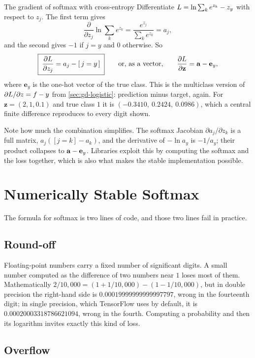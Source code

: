 \begin{derivation}{The gradient of softmax with cross-entropy}
Differentiate $L = \ln\sum_k e^{z_k} - z_y$ with respect to $z_j$. The first
term gives
\[
  \frac{\partial}{\partial z_j}\ln\sum_k e^{z_k}
  = \frac{e^{z_j}}{\sum_k e^{z_k}} = a_j ,
\]
and the second gives $-1$ if $j = y$ and $0$ otherwise. So
\[
  \boxed{\;\frac{\partial L}{\partial z_j} = a_j - [\,j = y\,]\;}
  \qquad\text{or, as a vector,}\qquad
  \frac{\partial L}{\partial\mathbf{z}} = \mathbf{a} - \mathbf{e}_y ,
\]
where $\mathbf{e}_y$ is the one-hot vector of the true class. This is the
multiclass version of $\partial L/\partial z = f - y$ from
\cref{sec:gd-logistic}: prediction minus target, again. For $\mathbf{z} = (2,
1, 0.1)$ and true class $1$ it is $(-0.3410,\ 0.2424,\ 0.0986)$, which a central
finite difference reproduces to every digit shown.

Note how much the combination simplifies. The softmax Jacobian
$\partial a_j/\partial z_k$ is a full matrix, $a_j([j=k] - a_k)$, and the
derivative of $-\ln a_y$ is $-1/a_y$; their product collapses to
$\mathbf{a} - \mathbf{e}_y$. Libraries exploit this by computing the softmax and the loss
together, which is also what makes the stable implementation possible.
\end{derivation}

\section{Numerically Stable Softmax}
\label{sec:stable-softmax}

The formula for softmax is two lines of code, and those two lines fail in
practice.

\subsection{Round-off}

Floating-point numbers carry a fixed number of significant digits. A small
number computed as the difference of two numbers near $1$ loses most of them.
Mathematically $2/10{,}000 = (1 + 1/10{,}000) - (1 - 1/10{,}000)$, but in double
precision the right-hand side is $0.00019999999999997797$, wrong in the
fourteenth digit; in single precision, which TensorFlow uses by default, it is
$0.00020003318786621094$, wrong in the fourth. Computing a probability and then
its logarithm invites exactly this kind of loss.

\subsection{Overflow}

